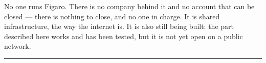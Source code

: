 \documentclass[11pt]{article}
\begin{document}
No one runs Figaro. There is no company behind it and no account that can be closed --- there is nothing to close, and no one in charge. It is shared infrastructure, the way the internet is. It is also still being built: the part described here works and has been tested, but it is not yet open on a public network.

\vspace{6pt}
{\color{ink}\rule{\linewidth}{0.4pt}}
\end{document}
